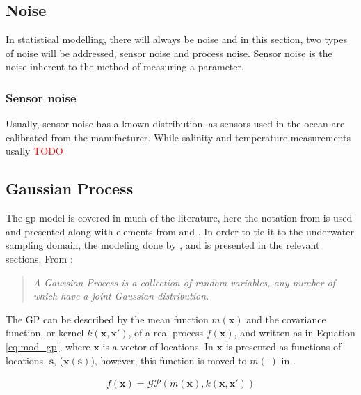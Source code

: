 \subsection{Noise}
\label{sec:noise}
In statistical modelling, there will always be noise and in this section, two types of noise will be addressed, sensor noise and process noise. Sensor noise is the noise inherent to the method of measuring a parameter. 
\subsubsection*{Sensor noise}
Usually, sensor noise has a known distribution, as sensors used in the ocean are calibrated from the manufacturer. While salinity and temperature measurements usally \textcolor{red}{TODO}

\subsection{Gaussian Process}
The \acrshort{gp} model is covered in much of the literature, here the notation from \cite{rasmussen2003gaussian} is used and presented along with elements from \cite{eidsvik2015value} and \cite{cressie2015statistics}. In order to tie it to the underwater sampling domain, the modeling done by \cite{fossum2019adaptive}, \cite{kemna2018multi} and \cite{stankiewicz2021adaptive} is presented in the relevant sections. From  \textcite{rasmussen2003gaussian}:
\begin{quote}
    \textit{A Gaussian Process is a collection of random variables, any number of which have a joint Gaussian distribution. }
\end{quote}
The GP can be described by the mean function $m(\mathbf{x})$ and the covariance function, or kernel $k(\mathbf{x},\mathbf{x}')$, of a real process $f(\mathbf{x})$, and written as in Equation \eqref{eq:mod_gp}, where $\mathbf{x}$ is a vector of locations. In \textcite{cressie2015statistics} $\mathbf{x}$ is presented as functions of locations, $\mathbf{s}$, ($\mathbf{x}(\mathbf{s})$), however, this function is moved to $m(\cdot)$ in \textcite{rasmussen2003gaussian}. 

\begin{align}
\label{eq:mod_gp}
    f(\mathbf{x}) = \mathcal{GP}(m(\mathbf{x}),k(\mathbf{x},\mathbf{x}'))
\end{align}


